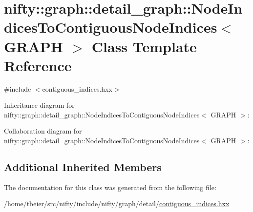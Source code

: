 \hypertarget{classnifty_1_1graph_1_1detail__graph_1_1NodeIndicesToContiguousNodeIndices}{}\section{nifty\+:\+:graph\+:\+:detail\+\_\+graph\+:\+:Node\+Indices\+To\+Contiguous\+Node\+Indices$<$ G\+R\+A\+P\+H $>$ Class Template Reference}
\label{classnifty_1_1graph_1_1detail__graph_1_1NodeIndicesToContiguousNodeIndices}


{\ttfamily \#include $<$contiguous\+\_\+indices.\+hxx$>$}



Inheritance diagram for nifty\+:\+:graph\+:\+:detail\+\_\+graph\+:\+:Node\+Indices\+To\+Contiguous\+Node\+Indices$<$ G\+R\+A\+P\+H $>$\+:


Collaboration diagram for nifty\+:\+:graph\+:\+:detail\+\_\+graph\+:\+:Node\+Indices\+To\+Contiguous\+Node\+Indices$<$ G\+R\+A\+P\+H $>$\+:
\subsection*{Additional Inherited Members}


The documentation for this class was generated from the following file\+:\begin{DoxyCompactItemize}
\item 
/home/tbeier/src/nifty/include/nifty/graph/detail/\hyperlink{contiguous__indices_8hxx}{contiguous\+\_\+indices.\+hxx}\end{DoxyCompactItemize}
